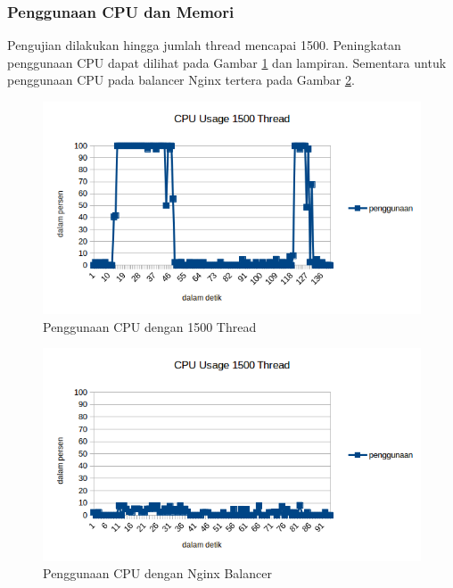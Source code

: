 \documentclass{ta-its}
\begin{document}
				\subsubsection{Penggunaan CPU dan Memori}
					Pengujian dilakukan hingga jumlah thread mencapai 1500. Peningkatan penggunaan CPU dapat dilihat pada Gambar \ref{gambarUsage1500} dan lampiran. Sementara untuk penggunaan CPU pada balancer Nginx tertera pada Gambar \ref{gambarUsageNginx}.
					
					\begin{figure}[h] %
						\centering
						\includegraphics[width=\linewidth]{contoh_img/usage/1500}
						\caption{Penggunaan CPU dengan 1500 Thread}
						\label{gambarUsage1500}
					\end{figure}
					
					\begin{figure}[h] %
						\centering
						\includegraphics[width=\linewidth]{contoh_img/usage/nginx}
						\caption{Penggunaan CPU dengan Nginx Balancer}
						\label{gambarUsageNginx}
					\end{figure}
					
\end{document}

